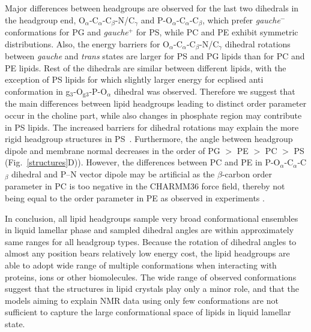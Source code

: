 \documentclass[aps,prl,superscriptaddress,twocolumn]{revtex4}
\begin{document}
Major differences between headgroups are observed for the last two dihedrals in the headgroup end,
O$_\alpha$-C$_\alpha$-C$_\beta$-N/C$_\gamma$ and P-O$_\alpha$-C$_\alpha$-C$_\beta$,
which prefer \textit{gauche$^-$} conformations for PG and \textit{gauche$^+$} for PS,
while PC and PE exhibit symmetric distributions.
Also, the energy barriers for O$_\alpha$-C$_\alpha$-C$_\beta$-N/C$_\gamma$ dihedral
rotations between \textit{gauche} and \textit{trans} states are larger for
PS and PG lipids than for PC and PE lipids. 
Rest of the dihedrals are similar between different lipids,
with the exception of PS lipids for which slightly larger energy for ecplised anti conformation
in g$_3$-O$_{{\mathrm g}3}$-P-O$_\alpha$ dihedral was observed.
Therefore we suggest that the main differences between lipid headgroups leading to distinct order parameter occur in the choline part, while also changes in phosphate region may contribute in PS lipids. The increased barriers for dihedral rotations may explain the more rigid headgroup structures in PS~\cite{browning80,buldt81}. Furthermore, the angle between headgroup dipole and membrane normal decreases in the order of PG $>$ PE  $>$ PC  $>$ PS (Fig.~\ref{structures}D)). However, the differences between PC and PE in P-O$_\alpha$-C$_\alpha$-C$_\beta$ dihedral
and P--N vector dipole may be artificial as the $\beta$-carbon order parameter in PC is too negative in the CHARMM36 force field, thereby not being equal to the order parameter in PE as observed in experiments \cite{botan15}.

In conclusion, all lipid headgroups sample very broad conformational ensembles in liquid lamellar phase and sampled dihedral angles are within approximately same ranges for all headgroup types. %
Because the rotation of dihedral angles to almost any position bears relatively low energy cost,
the lipid headgroups are able to adopt wide range of multiple conformations when interacting with proteins, ions or other biomolecules.
The wide range of observed conformations suggest that the structures in lipid crystals \cite{buldt81,pascher92} play only a minor role, and that the models aiming to explain NMR data using only few conformations \cite{seelig77c,davis83,Semchyschyn04,akutsu20} are not sufficient to capture the large conformational space of lipids in liquid lamellar state.
\end{document}
